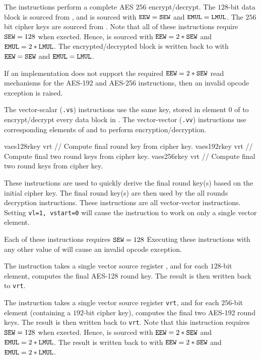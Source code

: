The  instructions perform a complete
AES $256$ encrypt/decrypt.
The $128$-bit data block is sourced from \vrt, and is sourced with
${\tt EEW}={\tt SEW}$ and ${\tt EMUL}={\tt LMUL}$.
The $256$ bit cipher keys are sourced from .
Note that all of these instructions require ${\tt SEW}=128$ when exected.
Hence,  is sourced with ${\tt EEW}=2*{\tt SEW}$ and ${\tt EMUL}=2*{\tt LMUL}$.
The encrypted/decrypted block is written back to \vrt with
${\tt EEW}={\tt SEW}$ and ${\tt EMUL}={\tt LMUL}$.

If an implementation does not support the required ${\tt EEW}=2*{\tt SEW}$
read mechanisms for the AES-192 and AES-256 instructions, then an invalid
opcode exception is raised.

The vector-scalar ({\tt *.vs}) instructions use the same key, stored
in element $0$ of  to encrypt/decrypt every data block in \vrt.
The vector-vector ({\tt *.vv}) instructions use corresponding elements
of  and \vrt to perform encryption/decryption.

\begin{cryptoisa}
vaes128rkey vrt    // Compute final round key from cipher key.
vaes192rkey vrt    // Compute final two round keys from cipher key.
vaes256rkey vrt    // Compute final two round keys from cipher key.
\end{cryptoisa}

These instructions are used to quickly derive the final round key(s)
based on the initial cipher key.
The final round key(s) are then used by the all rounds decryption
instructions.
These instructions are all vector-vector instructions.
Setting {\tt vl=1, vstart=0} will cause the instruction to work on only a
single vector element.

Each of these instructions requires ${\tt SEW}=128$
Executing these instructions with any other value of \SEW will cause
an invalid opcode exception.

The  instruction takes a single
vector source register \vrt, and for each $128$-bit element, computes
the final AES-128 round key.
The result is then written back to {\tt vrt}.

The  instruction takes a single
vector source register {\tt vrt}, and for each $256$-bit element
(containing a $192$-bit cipher key),
computes the final two AES-192 round keys.
The result is then written back to {\tt vrt}.
Note that this instruction requires ${\tt SEW}=128$ when exected.
Hence, \vrt is sourced with ${\tt EEW}=2*{\tt SEW}$ and ${\tt EMUL}=2*{\tt LMUL}$.
The result is written back to \vrt with
${\tt EEW}=2*{\tt SEW}$ and ${\tt EMUL}=2*{\tt LMUL}$.

